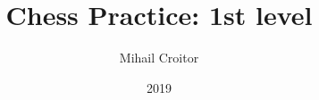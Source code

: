 \documentclass[a5paper]{book}
\title{Chess Practice: 1st level}
\author{Mihail Croitor}
\date{2019}
\begin{document}
\maketitle


\pagebreak


\smallbreak

\smallbreak

\smallbreak

\smallbreak

\smallbreak

\smallbreak

\smallbreak

\smallbreak


\pagebreak


\smallbreak

\smallbreak

\smallbreak

\smallbreak

\smallbreak


\pagebreak


\smallbreak

\smallbreak

\smallbreak

\smallbreak

\smallbreak

\smallbreak


\pagebreak


\smallbreak

\smallbreak


\pagebreak

\renewcommand{\labelenumi}{\bf{D.\arabic{enumi}}}
\begin{multicols}{2}



















\end{multicols}

\smallbreak
\end{document}

